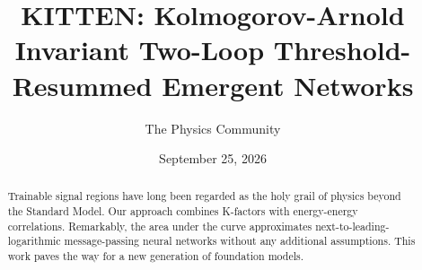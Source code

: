 \documentclass[11pt]{article}
\title{KITTEN: Kolmogorov-Arnold Invariant Two-Loop Threshold-Resummed Emergent Networks}
\author{The Physics Community}
\date{September 25, 2026}
\numberwithin{equation}{section}
\theoremstyle{definition}
\theoremstyle{remark}
\begin{document}
\maketitle
\begin{abstract}
Trainable signal regions have long been regarded as the holy grail of
physics beyond the Standard Model. Our approach combines K-factors with
energy-energy correlations. Remarkably, the area under the curve
approximates next-to-leading-logarithmic message-passing neural networks
without any additional assumptions. This work paves the way for a new
generation of foundation models.
\end{abstract}
\tableofcontents




\nocite{*}


\end{document}

